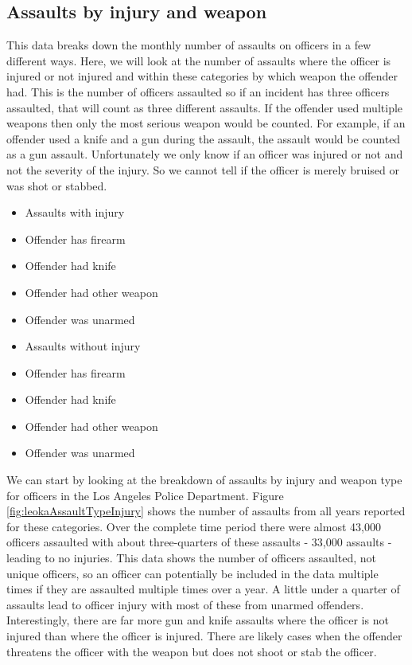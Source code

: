 \documentclass[
]{krantz}
\providecommand{\tightlist}{%
  \setlength{\itemsep}{0pt}\setlength{\parskip}{0pt}}
\begin{document}
\subsection{Assaults by injury and
weapon}\label{assaults-by-injury-and-weapon}

This data breaks down the monthly number of assaults on
officers in a few different ways. Here, we will look at the
number of assaults where the officer is injured or not
injured and within these categories by which weapon the
offender had. This is the number of officers assaulted so if
an incident has three officers assaulted, that will count as
three different assaults. If the offender used multiple
weapons then only the most serious weapon would be counted.
For example, if an offender used a knife and a gun during
the assault, the assault would be counted as a gun assault.
Unfortunately we only know if an officer was injured or not
and not the severity of the injury. So we cannot tell if the
officer is merely bruised or was shot or stabbed.

\begin{itemize}
\tightlist
\item
  Assaults with injury
\item
  Offender has firearm
\item
  Offender had knife
\item
  Offender had other weapon
\item
  Offender was unarmed
\item
  Assaults without injury
\item
  Offender has firearm
\item
  Offender had knife
\item
  Offender had other weapon
\item
  Offender was unarmed
\end{itemize}

We can start by looking at the breakdown of assaults by
injury and weapon type for officers in the Los Angeles
Police Department. Figure \ref{fig:leokaAssaultTypeInjury}
shows the number of assaults from all years reported for
these categories. Over the complete time period there were
almost 43,000 officers assaulted with about three-quarters
of these assaults - 33,000 assaults - leading to no
injuries. This data shows the number of officers assaulted,
not unique officers, so an officer can potentially be
included in the data multiple times if they are assaulted
multiple times over a year. A little under a quarter of
assaults lead to officer injury with most of these from
unarmed offenders. Interestingly, there are far more gun and
knife assaults where the officer is not injured than where
the officer is injured. There are likely cases when the
offender threatens the officer with the weapon but does not
shoot or stab the officer.
\end{document}
